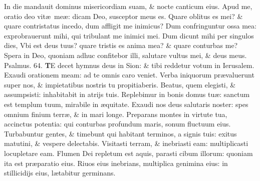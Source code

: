 \documentclass[a5paper,10pt]{book}
\def\ae{æ}
\begin{document}
\begin{multicols*}{2}
\newline \color{red} I\color{black}n die mandauit dominus misericordiam suam, \& nocte canticum eius.
\newline \color{red} A\color{black}pud me, oratio deo vit\ae \ me\ae : dicam Deo, susceptor meus es.
\newline \color{red} Q\color{black}uare oblitus es mei? \& quare contristatus incedo, dum affligit me inimicus?
\newline \color{red} D\color{black}um confringuntur ossa mea: exprobrauerunt mihi, qui tribulant me inimici mei.
\newline \color{red} D\color{black}um dicunt mihi per singulos dies, Vbi est deus tuus? quare tristis es anima mea? \& quare conturbas me?
\newline \color{red} S\color{black}pera in Deo, quoniam adhuc confitebor illi, salutare vultus mei, \& deus meus. \quad \color{red} Psalmus. \hypertarget{ps64}{64.} \color{black}
\vspace{-1em}
\lettrine[lines=2]{\bfseries \color{red} T}{}E decet hymnus deus in Sion: \& tibi reddetur votum in Ierusalem.
\newline \color{red} E\color{black}xaudi orationem meam: ad te omnis caro veniet.
\newline \color{red} V\color{black}erba iniquorum pr\ae valuerunt super nos, \& impietatibus nostris tu propitiaberis.
\newline \color{red} B\color{black}eatus, quem elegisti, \& assumpsisti: inhabitabit in atrijs tuis.
\newline \color{red} R\color{black}eplebimur in bonis domus tu\ae : sanctum est templum tuum, mirabile in \ae quitate.
\newline \color{red} E\color{black}xaudi nos deus salutaris noster: spes omnium finium terr\ae , \& in mari longe.
\newline \color{red} P\color{black}reparans montes in virtute tua, accinctus potentia: qui conturbas profundum maris, sonum fluctuum eius.
\newline \color{red} T\color{black}urbabuntur gentes, \& timebunt qui habitant terminos, a signis tuis: exitus matutini, \& vespere delectabis.
\newline \color{red} V\color{black}isitasti terram, \& inebriasti eam: multiplicasti locupletare eam.
\newline \color{red} F\color{black}lumen Dei repletum est aquis, parasti cibum illorum: quoniam ita est pr\ae paratio eius.
\newline \color{red} R\color{black}iuos eius inebrians, multiplica genimina eius: in stillicidijs eius, l\ae tabitur germinans.%

\end{multicols*}
\end{document}
